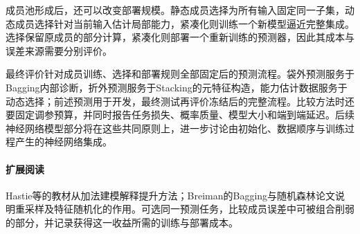 成员池形成后，还可以改变部署规模。静态成员选择为所有输入固定同一子集，动态成员选择针对当前输入估计局部能力，紧凑化则训练一个新模型逼近完整集成。选择保留原成员的部分计算，紧凑化则部署一个重新训练的预测器，因此其成本与误差来源需要分别评价。

最终评价针对成员训练、选择和部署规则全部固定后的预测流程。袋外预测服务于Bagging内部诊断，折外预测服务于Stacking的元特征构造，能力估计数据服务于动态选择；前述预测用于开发，最终测试再评价冻结后的完整流程。比较方法时还要固定调参预算，并同时报告任务损失、概率质量、模型大小和端到端延迟。后续神经网络模型部分将在这些共同原则上，进一步讨论由初始化、数据顺序与训练过程产生的神经网络集成。

\paragraph{扩展阅读}
Hastie等的教材从加法建模解释提升方法；Breiman的Bagging与随机森林论文说明重采样及特征随机化的作用。可选同一预测任务，比较成员误差中可被组合削弱的部分，并记录获得这一收益所需的训练与部署成本。
